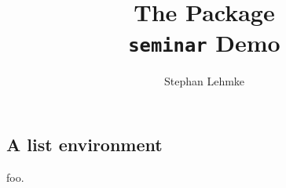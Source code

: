 \documentclass[portrait,semrot]{seminar}
\begin{document}
\begin{slide}

\title{The  Package\\{\normalfont \texttt{seminar} Demo}}
\author{Stephan Lehmke\\}
\maketitle

\newslide

\tableofcontents
\end{slide}

\begin{slide}
\centerslidesfalse
\section{A list environment}


\pause


\stepwise
{%
  \begin{description}
  \item[foo.] 
  \step{\item[baz.]} 
  \end{description}
  }



\end{slide}
\end{document}
